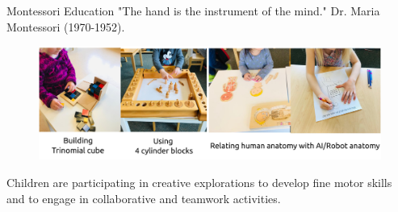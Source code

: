 {
\begin{frame}{Montessori Education} 
\vspace{3mm}
"The hand is the instrument of the mind."
Dr. Maria Montessori (1970-1952).

\vspace{2mm}
    \begin{figure}
        \centering
        \includegraphics[width=1.0\textwidth]{./figures/montessori/outputs/drawing-v00.png}
      \end{figure}

Children are participating in creative explorations to develop fine motor skills and to engage in collaborative and teamwork activities. 

\end{frame}
}


%
